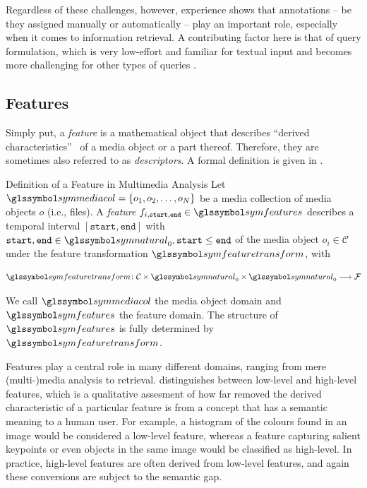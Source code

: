 Regardless of these challenges, however, experience shows that annotations -- be they assigned manually or automatically -- play an important role, especially when it comes to information retrieval. A contributing factor here is that of query formulation, which is very low-effort and familiar for textual input and becomes more challenging for other types of queries .

\subsection{Features}
Simply put, a \emph{feature} is a mathematical object that describes ``derived characteristics''~\cite{Blanken:2007multimedia} of a media object or a part thereof. Therefore, they are sometimes also referred to as \emph{descriptors}. A formal definition is given in .

\begin{definition}[label=definition:feature]{Definition of a Feature in Multimedia Analysis}{}
    Let $\symmediacol = \lbrace o_1, o_2, \ldots, o_N \rbrace$ be a media collection of media objects $o$ (i.e., files). A \emph{feature} $f_{i,\texttt{start},\texttt{end}} \in \symfeatures$ describes a temporal interval $[ \texttt{start}, \texttt{end} ]$ with $\texttt{start},\texttt{end} \in \symnatural_0, \texttt{start} \leq \texttt{end}$ of the media object $o_i \in \mathcal{C}$ under the feature transformation $\symfeaturetransform$, with 

    \begin{equation}
        \label{eq:feature_transformation}
        \symfeaturetransform \colon \mathcal{C} \times \symnatural_0 \times \symnatural_0 \longrightarrow \mathcal{F}
    \end{equation}

    We call $\symmediacol$ the media object domain and $\symfeatures$ the feature domain. The structure of  $\symfeatures$ is fully determined by $\symfeaturetransform$.
\end{definition}

Features play a central role in many different domains, ranging from mere (multi-)media analysis to retrieval. \cite{Blanken:2007multimedia} distinguishes between low-level and high-level features, which is a qualitative assesment of how far removed the derived characteristic of a particular feature is from a concept that has a semantic meaning to a human user. For example, a histogram of the colours found in an image would be considered a low-level feature, whereas a feature capturing salient keypoints or even objects in the same image would be classified as high-level. In practice, high-level features are often derived from low-level features, and again these conversions are subject to the semantic gap.

